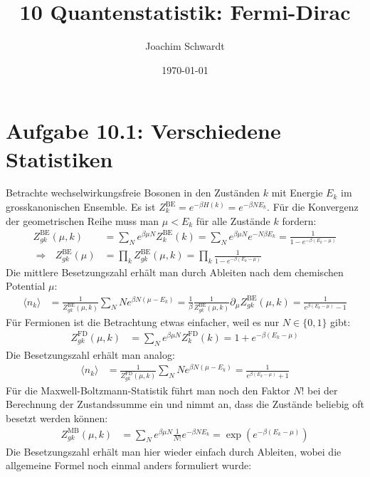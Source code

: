 \documentclass[a4paper,12pt]{article}
\newcommand{\bra}{}
\newcommand{\kla}{}
\newcommand{\tecxt}{}
\begin{document}
\title{10 Quantenstatistik: Fermi-Dirac}
\author{Joachim Schwardt}
\date{\today}
\maketitle

\section*{Aufgabe 10.1: Verschiedene Statistiken}
Betrachte wechselwirkungsfreie Bosonen in den Zuständen $k$ mit Energie $E_k$ im grosskanonischen Ensemble. Es ist $Z_k^\tecxt\text{BE}=e^{-\beta H(k)}=e^{-\beta NE_k}$. Für die Konvergenz der geometrischen Reihe muss man $\mu< E_k$ für alle Zustände $k$ fordern:
\begin{align*}
Z_{gk}^\tecxt\text{BE}(\mu,k)&=\sum_N e^{\beta\mu N}Z_k^\tecxt\text{BE}(k)=\sum_N e^{\beta\mu N} e^{-N\beta E_k}=\frac{1}{1-e^{-\beta (E_k-\mu)}}\\
\Rightarrow\ \ \ Z_{gk}^\tecxt\text{BE}(\mu)&=\prod_kZ_{gk}^\tecxt\text{BE}(\mu,k)=\prod_k\frac{1}{1-e^{-\beta (E_k-\mu)}}
\end{align*}
Die mittlere Besetzungszahl erhält man durch Ableiten nach dem chemischen Potential $\mu$:
\begin{align*}
\bra\langle {n_k}\rangle&=\frac{1}{Z_{gk}^\tecxt\text{BE}(\mu,k)}\sum_NNe^{\beta N(\mu -E_k)}=\frac{1}{\beta}\frac{1}{Z_{gk}^\tecxt\text{BE}(\mu,k)}\partial_\mu Z_{gk}^\tecxt\text{BE}(\mu,k)=\frac{1}{e^{\beta (E_k-\mu)}-1}
\end{align*}
Für Fermionen ist die Betrachtung etwas einfacher, weil es nur $N\in\{0,1\}$ gibt:
\begin{align*}
Z_{gk}^\tecxt\text{FD}(\mu,k)&=\sum_Ne^{\beta\mu N}Z_k^\tecxt\text{FD}(k)=1+e^{-\beta (E_k-\mu)}
\end{align*}
Die Besetzungszahl erhält man analog:
\begin{align*}
\bra\langle {n_k}\rangle&=\frac{1}{Z_{gk}^\tecxt\text{FD}(\mu,k)}\sum_NNe^{\beta N(\mu-E_k)}=\frac{1}{e^{\beta (E_k-\mu)}+1}
\end{align*}
Für die Maxwell-Boltzmann-Statistik führt man noch den Faktor $N!$ bei der Berechnung der Zustandssumme ein und nimmt an, dass die Zustände beliebig oft besetzt werden können:
\begin{align*}
Z_{gk}^\tecxt\text{MB}(\mu,k)&=\sum_Ne^{\beta\mu N}\frac{1}{N!}e^{-\beta NE_k}=\exp\kla\left( {e^{-\beta (E_k-\mu)}} \right)
\end{align*}
Die Besetzungszahl erhält man hier wieder einfach durch Ableiten, wobei die allgemeine Formel noch einmal anders formuliert wurde:
\end{document}
